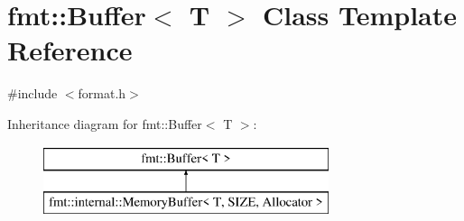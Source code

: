\hypertarget{classfmt_1_1Buffer}{}\section{fmt\+:\+:Buffer$<$ T $>$ Class Template Reference}
\label{classfmt_1_1Buffer}


{\ttfamily \#include $<$format.\+h$>$}

Inheritance diagram for fmt\+:\+:Buffer$<$ T $>$\+:\begin{figure}[H]
\begin{center}
\leavevmode
\includegraphics[height=2.000000cm]{classfmt_1_1Buffer}
\end{center}
\end{figure}
